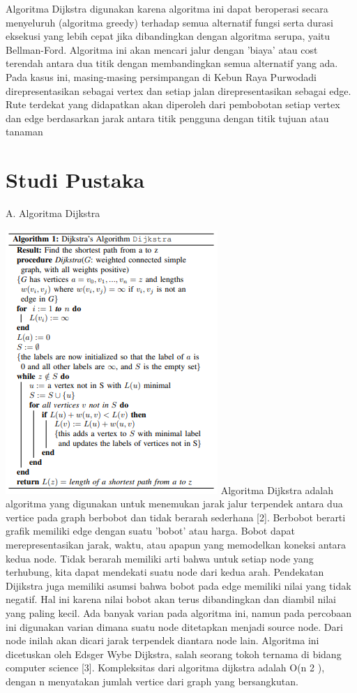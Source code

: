 \documentclass[conference]{IEEEtran}
\begin{document}
Algoritma Dijkstra digunakan karena algoritma ini dapat
beroperasi secara menyeluruh (algoritma greedy) terhadap
semua alternatif fungsi serta durasi eksekusi yang lebih cepat
jika dibandingkan dengan algoritma serupa, yaitu Bellman-Ford. Algoritma ini akan mencari jalur dengan ’biaya’ atau
cost terendah antara dua titik dengan membandingkan semua
alternatif yang ada.
Pada kasus ini, masing-masing persimpangan di Kebun
Raya Purwodadi direpresentasikan sebagai vertex dan setiap
jalan direpresentasikan sebagai edge. Rute terdekat yang didapatkan akan diperoleh dari pembobotan setiap vertex dan edge
berdasarkan jarak antara titik pengguna dengan titik tujuan
atau tanaman

\section{Studi Pustaka}

\vspace{0.5cm}
A. Algoritma Dijkstra

\includegraphics[scale=0.8]{tugas0522.jpg}
Algoritma Dijkstra adalah algoritma yang digunakan untuk
menemukan jarak jalur terpendek antara dua vertice pada
graph berbobot dan tidak berarah sederhana [2]. Berbobot
berarti grafik memiliki edge dengan suatu 'bobot' atau harga.
Bobot dapat merepresentasikan jarak, waktu, atau apapun
yang memodelkan koneksi antara kedua node. Tidak berarah
memiliki arti bahwa untuk setiap node yang terhubung, kita
dapat mendekati suatu node dari kedua arah. Pendekatan Dijikstra juga memiliki asumsi bahwa bobot pada edge memiliki
nilai yang tidak negatif. Hal ini karena nilai bobot akan
terus dibandingkan dan diambil nilai yang paling kecil. Ada
banyak varian pada algoritma ini, namun pada percobaan
ini digunakan varian dimana suatu node ditetapkan menjadi
source node. Dari node inilah akan dicari jarak terpendek
diantara node lain. Algoritma ini dicetuskan oleh Edsger
Wybe Dijkstra, salah seorang tokoh ternama di bidang computer science [3]. Kompleksitas dari algoritma dijkstra adalah
O(n
2
), dengan n menyatakan jumlah vertice dari graph yang
bersangkutan.\vspace{0.5cm}
\end{document}
